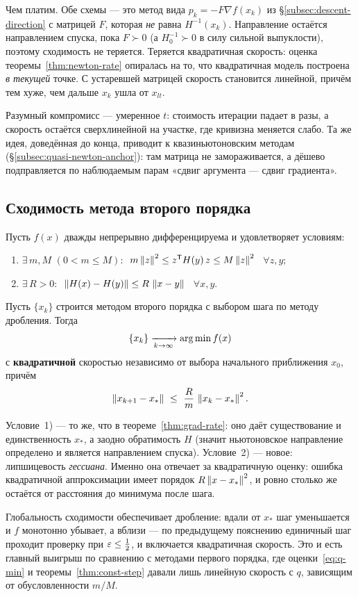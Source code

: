 \begin{idea}
Чем платим. Обе схемы — это метод вида $p_k = -F \nabla f(x_k)$ из
\S\ref{subsec:descent-direction} с матрицей $F$, которая \emph{не} равна
$H^{-1}(x_k)$. Направление остаётся направлением спуска, пока $F \succ 0$ (а
$H_0^{-1} \succ 0$ в силу сильной выпуклости), поэтому сходимость не теряется.
Теряется квадратичная скорость: оценка теоремы~\ref{thm:newton-rate} опиралась
на то, что квадратичная модель построена \emph{в текущей} точке. С устаревшей
матрицей скорость становится линейной, причём тем хуже, чем дальше $x_k$ ушла
от $x_{lt}$.

Разумный компромисс — умеренное $t$: стоимость итерации падает в разы, а
скорость остаётся сверхлинейной на участке, где кривизна меняется слабо. Та же
идея, доведённая до конца, приводит к квазиньютоновским методам
(\S\ref{subsec:quasi-newton-anchor}): там матрица не замораживается, а дёшево
подправляется по наблюдаемым парам «сдвиг аргумента — сдвиг градиента».
\end{idea}

\subsection{Сходимость метода второго порядка}

\begin{theorem}\label{thm:newton-rate}
Пусть $f(x)$ дважды непрерывно дифференцируема и удовлетворяет условиям:
\begin{enumerate}[label=\arabic*),left=0pt]
  \item $\exists\, m, M$ $(0 < m \le M)$:
        $\ m\left\lVert z \right\rVert^2 \le z^{\mathsf{T}} H(y)\, z \le M\left\lVert z \right\rVert^2$ \ $\forall z, y$;
  \item $\exists\, R > 0$:
        $\ \left\lVert H(x) - H(y) \right\rVert \le R\,\left\lVert x - y \right\rVert$ \ $\forall x, y$.
\end{enumerate}
Пусть $\{x_k\}$ строится методом второго порядка с выбором шага по методу
дробления. Тогда
\[
  \{x_k\} \xrightarrow[k \to \infty]{} \operatorname*{arg\,min} f(x)
\]
с \textbf{квадратичной} скоростью независимо от выбора начального приближения
$x_0$, причём
\[
  \norm{x_{k+1} - x_*} \ \le\ \frac{R}{m}\,\norm{x_k - x_*}^2 .
\]
\end{theorem}

\begin{idea}
Условие~1) — то же, что в теореме~\ref{thm:grad-rate}: оно даёт существование и
единственность $x_*$, а заодно обратимость $H$ (значит ньютоновское направление
определено и является направлением спуска). Условие~2) — новое: липшицевость
\emph{гессиана}. Именно она отвечает за квадратичную оценку: ошибка квадратичной
аппроксимации имеет порядок $R\left\lVert x - x_* \right\rVert^2$, и ровно столько же остаётся от
расстояния до минимума после шага.

Глобальность сходимости обеспечивает дробление: вдали от $x_*$ шаг уменьшается
и $f$ монотонно убывает, а вблизи — по предыдущему пояснению единичный шаг
проходит проверку при $\varepsilon \le \tfrac12$, и включается квадратичная скорость.
Это и есть главный выигрыш по сравнению с методами первого порядка, где
оценки~\eqref{eq:q-min} и теоремы~\ref{thm:const-step} давали лишь линейную
скорость с $q$, зависящим от обусловленности $m/M$.
\end{idea}
